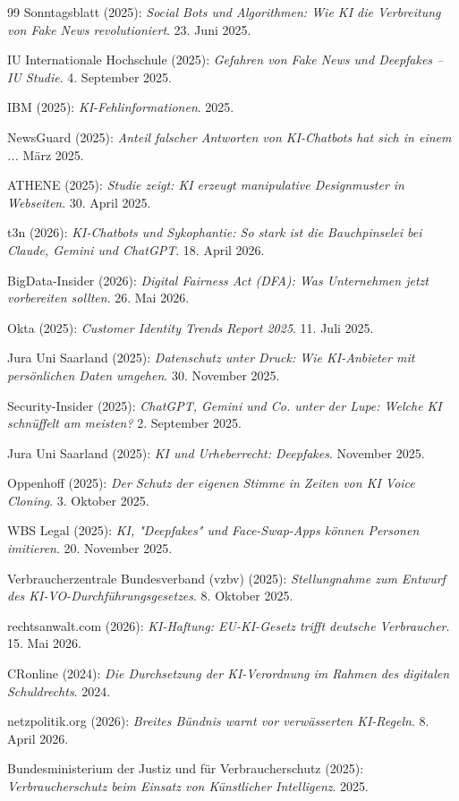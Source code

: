 \documentclass[12pt,a4paper]{article}
\begin{document}
\begin{thebibliography}{99}
		 Sonntagsblatt (2025): \emph{Social Bots und Algorithmen: Wie KI die Verbreitung von Fake News revolutioniert}. 23. Juni 2025.
		
		 IU Internationale Hochschule (2025): \emph{Gefahren von Fake News und Deepfakes – IU Studie}. 4. September 2025.
		
		 IBM (2025): \emph{KI-Fehlinformationen}. 2025.
		
		 NewsGuard (2025): \emph{Anteil falscher Antworten von KI-Chatbots hat sich in einem ...} März 2025.
		
		 ATHENE (2025): \emph{Studie zeigt: KI erzeugt manipulative Designmuster in Webseiten}. 30. April 2025.
		
		 t3n (2026): \emph{KI-Chatbots und Sykophantie: So stark ist die Bauchpinselei bei Claude, Gemini und ChatGPT}. 18. April 2026.
		
		 BigData-Insider (2026): \emph{Digital Fairness Act (DFA): Was Unternehmen jetzt vorbereiten sollten}. 26. Mai 2026.
		
		 Okta (2025): \emph{Customer Identity Trends Report 2025}. 11. Juli 2025.
		
		 Jura Uni Saarland (2025): \emph{Datenschutz unter Druck: Wie KI-Anbieter mit persönlichen Daten umgehen}. 30. November 2025.
		
		 Security-Insider (2025): \emph{ChatGPT, Gemini und Co. unter der Lupe: Welche KI schnüffelt am meisten?} 2. September 2025.
		
		 Jura Uni Saarland (2025): \emph{KI und Urheberrecht: Deepfakes}. November 2025.
		
		 Oppenhoff (2025): \emph{Der Schutz der eigenen Stimme in Zeiten von KI Voice Cloning}. 3. Oktober 2025.
		
		 WBS Legal (2025): \emph{KI, "Deepfakes" und Face-Swap-Apps können Personen imitieren}. 20. November 2025.
		
		 Verbraucherzentrale Bundesverband (vzbv) (2025): \emph{Stellungnahme zum Entwurf des KI-VO-Durchführungsgesetzes}. 8. Oktober 2025.
		
		 rechtsanwalt.com (2026): \emph{KI-Haftung: EU-KI-Gesetz trifft deutsche Verbraucher}. 15. Mai 2026.
		
		 CRonline (2024): \emph{Die Durchsetzung der KI-Verordnung im Rahmen des digitalen Schuldrechts}. 2024.
		
		 netzpolitik.org (2026): \emph{Breites Bündnis warnt vor verwässerten KI-Regeln}. 8. April 2026.
		
		 Bundesministerium der Justiz und für Verbraucherschutz (2025): \emph{Verbraucherschutz beim Einsatz von Künstlicher Intelligenz}. 2025.
		
		
	\end{thebibliography}
	
\end{document}

